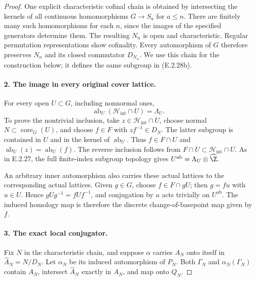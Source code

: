 \begin{proof}
One explicit characteristic cofinal chain is obtained by
intersecting the kernels of all continuous homomorphisms
\(G\to S_a\) for \(a\leq n\). There are finitely many such
homomorphisms for each \(n\), since the images of the specified
generators determine them. The resulting \(N_n\) is open and
characteristic. Regular permutation representations show
cofinality. Every automorphism of \(G\) therefore preserves
\(N_n\) and its closed commutator \(D_{N_n}\). We use this
chain for the construction below; it defines the same subgroup
in (E.2.28b).

\paragraph{2. The image in every original cover lattice.}
For every open \(U\subset G\), including nonnormal ones,
\[
 \operatorname{ab}_U(\mathcal H_{\mathrm{int}}\cap U)
       =\Lambda_U.
 \tag{E.2.28g}
\]
To prove the nontrivial inclusion, take
\(z\in\mathcal H_{\mathrm{int}}\cap U\), choose normal
\(N\subset\operatorname{core}_G(U)\), and choose \(f\in F\)
with \(zf^{-1}\in D_N\). The latter subgroup is contained in
\(U\) and in the kernel of \(\operatorname{ab}_U\).
Thus \(f\in F\cap U\) and
\(\operatorname{ab}_U(z)=\operatorname{ab}_U(f)\).
The reverse inclusion follows from
\(F\cap U\subset\mathcal H_{\mathrm{int}}\cap U\).
As in E.2.27, the full finite-index subgroup topology gives
\(U^{\mathrm{ab}}=\Lambda_U\otimes\widehat\Z\).

An arbitrary inner automorphism also carries these actual
lattices to the corresponding actual lattices. Given \(g\in G\),
choose \(f\in F\cap gU\); then \(g=fu\) with \(u\in U\).
Hence \(gUg^{-1}=fUf^{-1}\), and conjugation by \(u\)
acts trivially on \(U^{\mathrm{ab}}\). The induced homology
map is therefore the discrete change-of-basepoint map
given by \(f\).

\paragraph{3. The exact local conjugator.}
Fix \(N\) in the characteristic chain, and suppose \(\alpha\)
carries \(A_N\) onto itself in \(\widehat A_N=N/D_N\).
Let \(\alpha_N\) be its induced automorphism of \(P_N\).
Both \(\Gamma_N\) and \(\alpha_N(\Gamma_N)\) contain
\(A_N\), intersect \(\widehat A_N\) exactly in \(A_N\),
and map onto \(Q_N\).


\end{proof}
